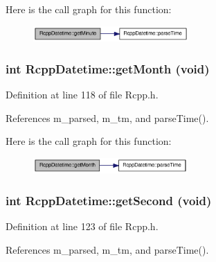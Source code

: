 Here is the call graph for this function:\nopagebreak
\begin{figure}[H]
\begin{center}
\leavevmode
\includegraphics[width=168pt]{classRcppDatetime_adb41bd524ead66d69e129b1f2767358a_cgraph}
\end{center}
\end{figure}
\hypertarget{classRcppDatetime_aa7f04947d2a27e4bba2d19efa21771ed}{
\subsubsection[{getMonth}]{\setlength{\rightskip}{0pt plus 5cm}int RcppDatetime::getMonth (void)}}
\label{classRcppDatetime_aa7f04947d2a27e4bba2d19efa21771ed}


Definition at line 118 of file Rcpp.h.

References m\_\-parsed, m\_\-tm, and parseTime().

Here is the call graph for this function:\nopagebreak
\begin{figure}[H]
\begin{center}
\leavevmode
\includegraphics[width=167pt]{classRcppDatetime_aa7f04947d2a27e4bba2d19efa21771ed_cgraph}
\end{center}
\end{figure}
\hypertarget{classRcppDatetime_a2feb900005890d183cc5f6a626c4d614}{
\subsubsection[{getSecond}]{\setlength{\rightskip}{0pt plus 5cm}int RcppDatetime::getSecond (void)}}
\label{classRcppDatetime_a2feb900005890d183cc5f6a626c4d614}


Definition at line 123 of file Rcpp.h.

References m\_\-parsed, m\_\-tm, and parseTime().

